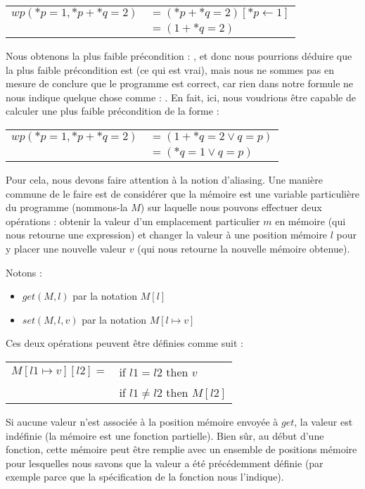 \begin{tabular}{ll}
$wp(*p = 1, *p + *q = 2)$ & $= (*p + *q = 2)[*p \leftarrow 1]$\\
                          & $= (1 + *q = 2)$
\end{tabular}


Nous obtenons la plus faible précondition : , et donc
nous pourrions déduire que la plus faible précondition est 
(ce qui est vrai), mais nous ne sommes pas en mesure de conclure que le programme
est correct, car rien dans notre formule ne nous indique quelque chose comme :
. En fait, ici, nous voudrions être capable de
calculer une plus faible précondition de la forme :


\begin{tabular}{ll}
$wp(*p = 1, *p + *q = 2)$ & $= (1 + *q = 2 \vee q = p)$\\
                          & $= (*q = 1 \vee q = p)$
\end{tabular}


Pour cela, nous devons faire attention à la notion d'aliasing. Une manière
commune de le faire est de considérer que la mémoire est une variable particulière
du programme (nommons-la $M$) sur laquelle nous pouvons effectuer deux opérations :
obtenir la valeur d'un emplacement particulier $m$ en mémoire (qui nous retourne une
expression) et changer la valeur à une position mémoire $l$ pour y placer une nouvelle
valeur $v$ (qui nous retourne la nouvelle mémoire obtenue).


Notons :


\begin{itemize}
\item $get(M,l)$ par la notation $M[l]$
\item $set(M,l,v)$ par la notation $M[l \mapsto v]$
\end{itemize}


Ces deux opérations peuvent être définies comme suit :


\begin{tabular}{ll}
  $M[l1 \mapsto v][l2] =$ & if $l1   =  l2$ then $v$ \\
                          & if $l1 \neq l2$ then $M[l2]$
\end{tabular}


Si aucune valeur n'est associée à la position mémoire envoyée à $get$,
la valeur est indéfinie (la mémoire est une fonction partielle). Bien sûr, au début
d'une fonction, cette mémoire peut être remplie avec un ensemble de positions mémoire
pour lesquelles nous savons que la valeur a été précédemment définie (par exemple
parce que la spécification de la fonction nous l'indique).


